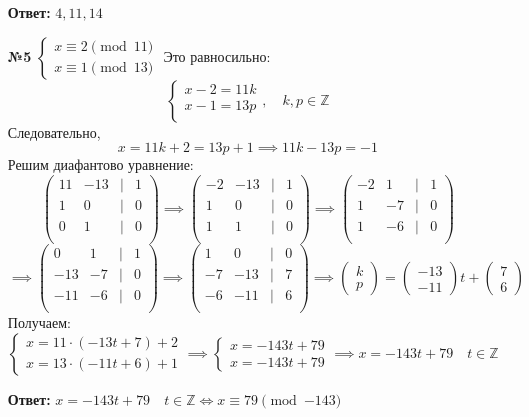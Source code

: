 \documentclass[a4paper]{article}
\newcommand{\mat}[1]{\begin{pmatrix} #1 \end{pmatrix}}
\newcommand{\case}[1]{\begin{cases} #1 \end{cases}}
\newcommand{\lr}{\Leftrightarrow}
\newcommand{\ZZ}{\mathbb{Z}}
\begin{document}
\begin{enumerate}
    \textbf{Ответ:} $4, 11, 14$

    \item[\textbf{№5}]$\case{
        x \equiv 2 \pmod{11}\\ 
        x \equiv 1 \pmod{13}
    }$
    Это равносильно:
    $$\case{
        x-2 = 11k\\
        x-1 = 13p\\
    }, \quad k, p \in \ZZ$$
    Следовательно,
    $$x = 11k+2 = 13p+1 \implies 11k-13p = -1$$
    Решим диафантово уравнение:
    $$\mat{
        11 & -13 & | & 1\\ 
        1 & 0 & | & 0\\
        0 & 1 & | & 0\\
    } \implies \mat{
        -2 & -13 & | & 1\\ 
        1 & 0 & | & 0\\
        1 & 1 & | & 0\\
    }\implies \mat{
        -2 & 1& | & 1\\ 
        1 & -7 & | & 0\\
        1 & -6 & | & 0\\
    }
    $$
    $$\implies \mat{
        0 & 1& | & 1\\ 
        -13 & -7 & | & 0\\
        -11 & -6 & | & 0\\
    }\implies \mat{
        1 & 0 & | & 0\\ 
        -7 & -13 & | & 7\\
        -6 & -11 & | & 6\\
    } \implies \mat{k \\ p} = \mat{-13 \\ -11}t + \mat{7\\6}$$
    Получаем:
    $$\case{
        x = 11\cdot(-13t+7)+2\\
        x = 13\cdot(-11t+6)+1
    }\implies \case{
        x = -143t+79\\
        x = -143t+79
    } \implies x = -143t+79 \quad t \in \ZZ$$

    \textbf{Ответ: }$x = -143t+79 \quad t \in \ZZ \lr x \equiv 79 \pmod{-143}$
    

\end{enumerate}
\end{document}

